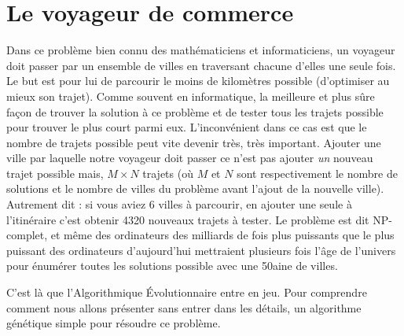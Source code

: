 \section*{Le voyageur de commerce}\label{sec:intro:vc}

Dans ce problème bien connu des mathématiciens et informaticiens, un voyageur doit passer par un ensemble de villes en traversant chacune d'elles une seule fois. Le but est pour lui de parcourir le moins de kilomètres possible (d'optimiser au mieux son trajet). Comme souvent en informatique, la meilleure et plus sûre façon de trouver la solution à ce problème et de tester tous les trajets possible pour trouver le plus court parmi eux. L'inconvénient dans ce cas est que le nombre de trajets possible peut vite devenir très, très important. Ajouter une ville par laquelle notre voyageur doit passer ce n'est pas ajouter \emph{un} nouveau trajet possible mais, $M \times N$ trajets (où $M$ et $N$ sont respectivement le nombre de solutions et le nombre de villes du problème avant l'ajout de la nouvelle ville). Autrement dit : si vous aviez 6 villes à parcourir, en ajouter une seule à l'itinéraire c'est obtenir 4320 nouveaux trajets à tester. Le problème est dit NP-complet, et même des ordinateurs des milliards de fois plus puissants que le plus puissant des ordinateurs d'aujourd'hui mettraient plusieurs fois l'\^{a}ge de l'univers pour énumérer toutes les solutions possible avec une 50aine de villes.

C'est là que l'Algorithmique \'Evolutionnaire entre en jeu. Pour comprendre comment nous allons présenter sans entrer dans les détails, un algorithme génétique simple pour résoudre ce problème.

